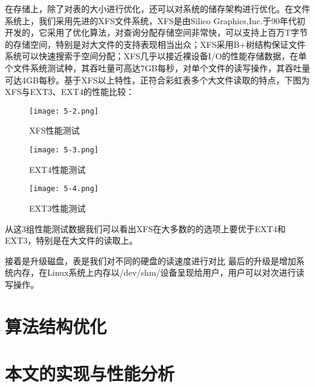 在存储上，除了对表的大小进行优化，还可以对系统的储存架构进行优化。在文件系统上，我们采用先进的XFS文件系统，XFS是由Silico Graphics,Inc.于90年代初开发的，它采用了优化算法，对查询分配存储空间非常快，可以支持上百万T字节的存储空间，特别是对大文件的支持表现相当出众；XFS采用B+树结构保证文件系统可以快速搜索于空间分配；XFS几乎以接近裸设备I/O的性能存储数据，在单个文件系统测试种，其吞吐量可高达7GB每秒，对单个文件的读写操作，其吞吐量可达4GB每秒。基于XFS以上特性，正符合彩虹表多个大文件读取的特点，下图为XFS与EXT3、EXT4的性能比较：
\begin{figure}[!ht]
\centering
\texttt{[image: 5-2.png]}
\caption{XFS性能测试}
\label{fig:5.2}
\end{figure}
\begin{figure}[!ht]
\centering
\texttt{[image: 5-3.png]}
\caption{EXT4性能测试}
\label{fig:5.3}
\end{figure}
\begin{figure}[!ht]
\centering
\texttt{[image: 5-4.png]}
\caption{EXT3性能测试}
\label{fig:5.4}
\end{figure}
从这3组性能测试数据我们可以看出XFS在大多数的的选项上要优于EXT4和EXT3，特别是在大文件的读取上。

接着是升级磁盘，表是我们对不同的硬盘的读速度进行对比
最后的升级是增加系统内存，在Linux系统上内存以/dev/shm/设备呈现给用户，用户可以对次进行读写操作。
\section{算法结构优化}
\section{本文的实现与性能分析}
